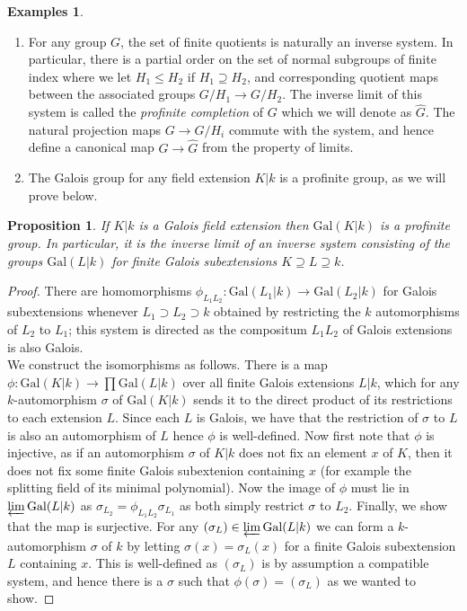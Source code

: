 \documentclass{article}
\theoremstyle{definition}
\newtheorem{examples}[theorem]{Examples}
\theoremstyle{remark}
\theoremstyle{plain}
\newtheorem{proposition}[theorem]{Proposition}
\begin{document}
\begin{examples} \text{}
\begin{enumerate}
	\item For any group $G$, the set of finite quotients is naturally an inverse system.
		In particular, there is a partial order on the set of normal subgroups of finite index where we let $H_1 \leq H_2$ if $H_1 \supseteq H_2$, and corresponding quotient maps between the associated groups $G/H_1 \to G/H_2$.
		The inverse limit of this system is called the \textit{profinite completion} of $G$ which we will denote as $\widehat{G}$.	
		The natural projection maps $G \to G/H_i$ commute with the system, and hence define a canonical map $G \to \widehat{G}$ from the property of limits.
	\item The Galois group for any field extension $K|k$ is a profinite group, as we will prove below.
		\end{enumerate}
\end{examples}


\begin{proposition}
	If $K|k$ is a Galois field extension then $\text{Gal}(K|k)$ is a profinite group.
	In particular, it is the inverse limit of an inverse system consisting of the groups $\text{Gal}(L|k)$ for finite Galois subextensions $K \supseteq L \supseteq k$.
\end{proposition}
\begin{proof}	
	There are homomorphisms $\phi_{L_1L_2}: \text{Gal}(L_1|k) \to \text{Gal}(L_2|k)$ for Galois subextensions whenever $L_1 \supset L_2 \supset k$ obtained by restricting the $k$ automorphisms of $L_2$ to $L_1$; this system is directed as the compositum $L_1 L_2$ of Galois extensions is also Galois.\\
\indent We construct the isomorphisms as follows.
There is a map $\phi: \text{Gal}(K|k) \to \prod \text{Gal}(L|k)$ over all finite Galois extensions $L|k$, which for any $k$-automorphism $\sigma$ of $\text{Gal}(K|k)$ sends it to the direct product of its restrictions to each extension $L$.
Since each $L$ is Galois, we have that the restriction of $\sigma$ to $L$ is also an automorphism of $L$ hence $\phi$ is well-defined.
Now first note that $\phi$ is injective, as if an automorphism $\sigma$ of $K|k$ does not fix an element $x$ of $K$, then it does not fix some finite Galois subextenion containing $x$ (for example the splitting field of its minimal polynomial).
Now the image of $\phi$ must lie in $\varprojlim \text{Gal}(L|k)$ as  $\sigma_{L_2} = \phi_{L_1 L_2} \sigma_{L_1}$ as both simply restrict $\sigma$ to $L_2$.
Finally, we show that the map is surjective.
For any $(\sigma_L) \in \varprojlim \text{Gal}(L|k)$ we can form a $k$-automorphism  $\sigma$ of $k$ by letting $\sigma(x) = \sigma_L(x)$ for a finite Galois subextension $L$ containing $x$. 
This is well-defined as $(\sigma_L)$ is by assumption a compatible system, and hence there is a $\sigma$ such that $\phi(\sigma) = (\sigma_L)$ as we wanted to show.
\end{proof}
\end{document}
